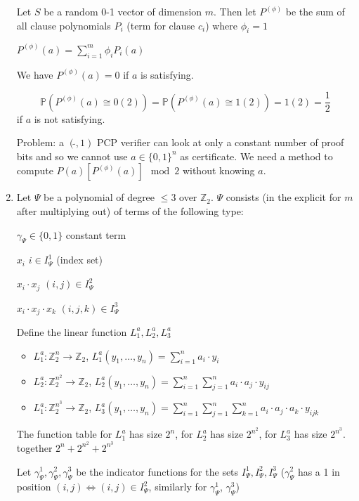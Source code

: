 \documentclass[11pt]{article}
\theoremstyle{definition}
\theoremstyle{definition}
\begin{document}
\begin{enumerate}
	Let $ S $ be a random 0-1 vector of dimension $ m $. Then let $ P^{(\phi)} $ be the sum of all clause polynomials $ P_i $ (term for clause $ c_i $) where $ \phi_i = 1 $
	
	$ P^{(\phi)} (a) = \sum \limits_{i = 1}^m \phi_i P_i(a) $
	
	We have $ P^{(\phi)} (a) = 0 $ if $ a $ is satisfying.
	
	\[ \mathbb{P}(P^{(\phi)} (a) \cong 0(2)) = \mathbb{P}(P^{(\phi)} (a) \cong 1(2)) = 1(2) = \frac{1}{2} \]
	if $ a $ is not satisfying.
	
	Problem: a $ (\tilde{}, 1) $ PCP verifier can look at only a constant number of proof bits and so we cannot use $ a \in \{0, 1\}^n $ as certificate. We need a method to compute $ P(a) [P^{(\phi)}(a)] \mod 2 $ without knowing $ a $.
	
\item Let $ \Psi $ be a polynomial of degree $ \leq 3 $ over $ \mathbb{Z}_2 $. $ \Psi $ consists (in the explicit for $ m $ after multiplying out) of terms of the following type:

	$ \gamma_{\Psi} \in \{0, 1\} $ constant term
	
	$ x_i $ $ i \in I_{\Psi}^1 $ (index set)
	
	$ x_i \cdot x_j $ $ (i, j )\in I_{\Psi}^2 $
	
	$ x_i \cdot x_j \cdot x_k $ $ (i, j, k)\in I_{\Psi}^3 $
	
	Define the linear function $ L_1^a, L_2^a, L_3^a $
	\begin{itemize}
	\item $ L_1^a: \mathbb{Z}_2^n \rightarrow \mathbb{Z}_2 $, $ L_1^a (y_1, \dots, y_n) = \sum \limits_{i = 1}^n a_i \cdot y_i $
	\item $ L_2^a: \mathbb{Z}_2^{n^2} \rightarrow \mathbb{Z}_2 $, $ L_2^a (y_1, \dots, y_n) = \sum \limits_{i = 1}^n \sum \limits_{j = 1}^n a_i \cdot a_j \cdot y_{ij} $
	\item $ L_1^a: \mathbb{Z}_2^{n^3} \rightarrow \mathbb{Z}_2 $, $ L_3^a (y_1, \dots, y_n) = \sum \limits_{i = 1}^n \sum \limits_{j = 1}^n \sum \limits_{k = 1}^n a_i \cdot a_j \cdot a_k \cdot y_{i j k} $
	\end{itemize}
	
	The function table for $ L_1^a $ has size $ 2^n $, for $ L_2^a $ has size $ 2^{n^2} $, for $ L_3^a $ has size $ 2^{n^3} $. together $ 2^n + 2^{n^2} + 2^{n^3} $
	
	Let $ \gamma_{\Psi}^1, \gamma_{\Psi}^2, \gamma_{\Psi}^3 $ be the indicator functions for the sets $ I_{\Psi}^1, I_{\Psi}^2, I_{\Psi}^3 $ ($ \gamma_{\Psi}^2 $ has a 1 in position $ (i, j ) \Leftrightarrow (i, j) \in I_{\Psi}^2 $, similarly for $ \gamma_{\Psi}^1 $, $ \gamma_{\Psi}^3 $)
	

\end{enumerate}
\end{document}
